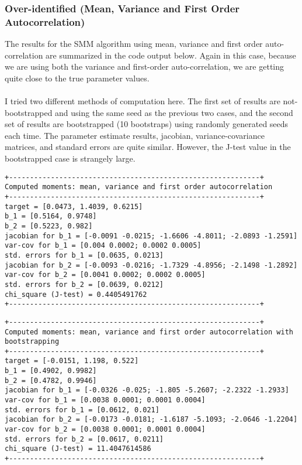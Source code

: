 \documentclass[12pt]{article}
\begin{document}
\subsubsection*{Over-identified (Mean, Variance and First Order Autocorrelation)}

The results for the SMM algorithm using mean, variance and first order auto-correlation are summarized in the code output below. Again in this case, because we are using both the variance and first-order auto-correlation, we are getting quite close to the true parameter values. \\\\
I tried two different methods of computation here. The first set of results are not-bootstrapped and using the same seed as the previous two cases, and the second set of results are bootstrapped (10 bootstraps) using randomly generated seeds each time. The parameter estimate results, jacobian, variance-covariance matrices, and standard errors are quite similar. However, the J-test value in the bootstrapped case is strangely large.

\begin{verbatim}
+------------------------------------------------------------+
Computed moments: mean, variance and first order autocorrelation 
+------------------------------------------------------------+
target = [0.0473, 1.4039, 0.6215]
b_1 = [0.5164, 0.9748]
b_2 = [0.5223, 0.982]
jacobian for b_1 = [-0.0091 -0.0215; -1.6606 -4.8011; -2.0893 -1.2591]
var-cov for b_1 = [0.004 0.0002; 0.0002 0.0005]
std. errors for b_1 = [0.0635, 0.0213]
jacobian for b_2 = [-0.0093 -0.0216; -1.7329 -4.8956; -2.1498 -1.2892]
var-cov for b_2 = [0.0041 0.0002; 0.0002 0.0005]
std. errors for b_2 = [0.0639, 0.0212]
chi_square (J-test) = 0.4405491762
+------------------------------------------------------------+
\end{verbatim}
\clearpage
\begin{verbatim}
+------------------------------------------------------------+
Computed moments: mean, variance and first order autocorrelation with bootstrapping
+------------------------------------------------------------+
target = [-0.0151, 1.198, 0.522]
b_1 = [0.4902, 0.9982]
b_2 = [0.4782, 0.9946]
jacobian for b_1 = [-0.0326 -0.025; -1.805 -5.2607; -2.2322 -1.2933]
var-cov for b_1 = [0.0038 0.0001; 0.0001 0.0004]
std. errors for b_1 = [0.0612, 0.021]
jacobian for b_2 = [-0.0173 -0.0181; -1.6187 -5.1093; -2.0646 -1.2204]
var-cov for b_2 = [0.0038 0.0001; 0.0001 0.0004]
std. errors for b_2 = [0.0617, 0.0211]
chi_square (J-test) = 11.4047614586
+------------------------------------------------------------+
\end{verbatim}
\end{document}
